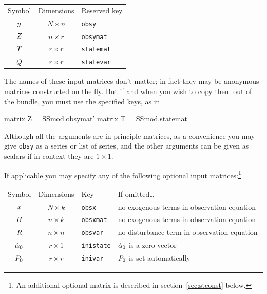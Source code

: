 \begin{center}
\begin{tabular}{ccl}
Symbol & Dimensions & Reserved key \\[6pt]
$y$    & $N \times n$ & \texttt{obsy}\\
$Z$   & $n \times r$ & \texttt{obsymat}\\
$T$  & $r \times r$ & \texttt{statemat}\\
$Q$  & $r \times r$ & \texttt{statevar}\\
\end{tabular}
\end{center}


The names of these input matrices don't matter; in fact they may be
anonymous matrices constructed on the fly. But if and when you wish to
copy them out of the bundle, you must use the specified keys, as in
\begin{code}
matrix Z = SSmod.obsymat'
matrix T = SSmod.statemat
\end{code}

Although all the arguments are in principle matrices, as a convenience
you may give \texttt{obsy} as a series or list of series, and the
other arguments can be given as scalars if in context they are
$1 \times 1$.

If applicable you may specify any of the following optional input
matrices:\footnote{An additional optional matrix is described in
section~\ref{sec:stconst} below.}

\begin{center}
\begin{tabular}{ccll}
Symbol & Dimensions & Key & If omitted\dots \\[6pt]
$x$ & $N \times k$ & \texttt{obsx} &
 no exogenous terms in observation equation\\
$B$ & $n \times k$ & \texttt{obsxmat} &
 no exogenous terms in observation equation\\
$R$ & $n \times n$ & \texttt{obsvar} &
 no disturbance term in observation equation \\
$\hat{\alpha}_0$ & $r \times 1$ & \texttt{inistate} &
 $\hat{\alpha}_0$ is a zero vector\\
$P_0$ & $r \times r$ & \texttt{inivar} &
 $P_0$ is set automatically
\end{tabular}
\end{center}

